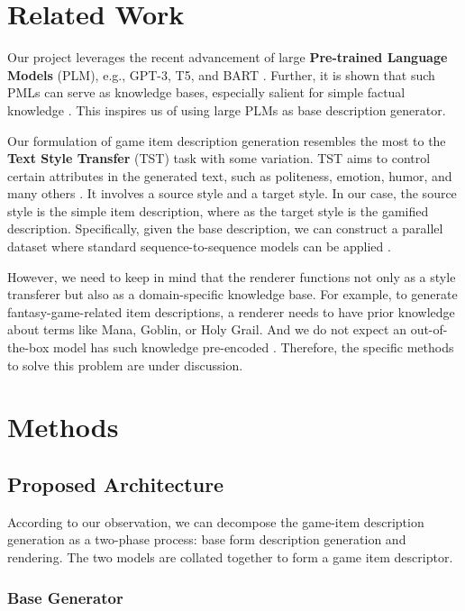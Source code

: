 \documentclass[11pt]{article}
\begin{document}
\section{Related Work}
  Our project leverages the recent advancement of large \textbf{Pre-trained Language Models} (PLM), e.g., 
    GPT-3, T5, and BART \cite{gpt-3, t5, bart}. Further, it is shown that such PMLs can serve as knowledge bases, 
    especially salient for simple factual knowledge \cite{comet, kblm}. This inspires us of using large PLMs as 
    base description generator.

  Our formulation of game item description generation resembles the most to the \textbf{Text Style Transfer} (TST) 
    task with some variation. 
    TST aims to control certain attributes in the generated text, such as politeness, emotion, humor, 
    and many others \cite{tst_survey}. It involves a source style and a target style. In our case, the source 
    style is the simple item description, where as the target style is the gamified description. Specifically, 
    given the base description, we can construct a parallel dataset where standard sequence-to-sequence models 
    can be applied \cite{s2s_style}.

    However, we need to keep in mind that the renderer functions not only as a style transferer but also as a 
      domain-specific knowledge base. For example, to generate fantasy-game-related item descriptions, a renderer 
      needs to have prior knowledge about terms like Mana, Goblin, or Holy Grail. And we do not expect an out-of-the-box 
      model has such knowledge pre-encoded \cite{domain_adaptation}. Therefore, the specific methods to solve this problem are under discussion.


\section{Methods}
  \subsection{Proposed Architecture}
    According to our observation, we can decompose the game-item description 
      generation as a two-phase process: base form description generation and rendering.
      The two models are collated together to form a game item descriptor.

    \subsubsection{Base Generator}
\end{document}
